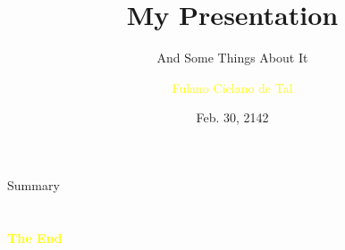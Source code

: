 \documentclass[aspectratio=43]{beamer}
\title{My Presentation} %
\subtitle{And Some Things About It}
\author[F.de Tal]{\textcolor{yellow}{Fulano Ciclano de Tal}}
\institute[IMUFSP]{
    \textcolor{white}{Institute of Mathematics}%
    \\%
    \textcolor{white}{Federal University of Some Place}%
} %
\date{Feb. 30, 2142}
\begin{document}
    
    \frame{\titlepage}
    
    \begin{frame}{Summary}
        \tableofcontents
    \end{frame}
    
    
    
    
    
     
    
    
    
    

    \section{}
    \begin{frame}{}
        \centering
            \Huge\bfseries
        \textcolor{yellow}{The End}
    \end{frame}
\end{document}
